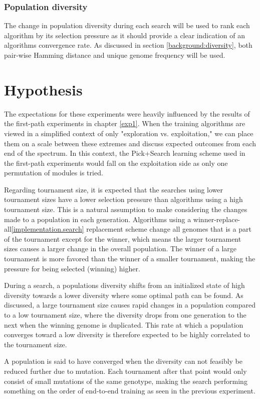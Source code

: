 \subsubsection{Population diversity}
The change in population diversity during each search will be used to rank each algorithm by its selection pressure as it should provide a clear indication of an algorithms convergence rate. As discussed in section \ref{background:diversity}, both pair-wise Hamming distance and unique genome frequency will be used.

\section{Hypothesis}
\label{exp2:hypothesis}
The expectations for these experiments were heavily influenced by the results of the first-path experiments in chapter \ref{exp1}. When the training algorithms are viewed in a simplified context of only "exploration vs. exploitation," we can place them on a scale between these extremes and discuss expected outcomes from each end of the spectrum. In this context, the Pick+Search learning scheme used in the first-path experiments would fall on the exploitation side as only one permutation of modules is tried.

Regarding tournament size, it is expected that the searches using lower tournament sizes have a lower selection pressure than algorithms using a high tournament size. This is a natural assumption to make considering the changes made to a population in each generation. Algorithms using a winner-replace-all\ref{implementation.search} replacement scheme change all genomes that is a part of the tournament except for the winner, which means the larger tournament sizes causes a larger change in the overall population. The winner of a large tournament is more favored than the winner of a smaller tournament, making the pressure for being selected (winning) higher. 

During a search, a populations diversity shifts from an initialized state of high diversity towards a lower diversity where some optimal path can be found. As discussed, a large tournament size causes rapid changes in a population compared to a low tournament size, where the diversity drops from one generation to the next when the winning genome is duplicated. This rate at which a population converges toward a low diversity is therefore expected to be highly correlated to the tournament size.

A population is said to have converged when the diversity can not feasibly be reduced further due to mutation. Each tournament after that point would only consist of small mutations of the same genotype, making the search performing something on the order of end-to-end training as seen in the previous experiment. 

